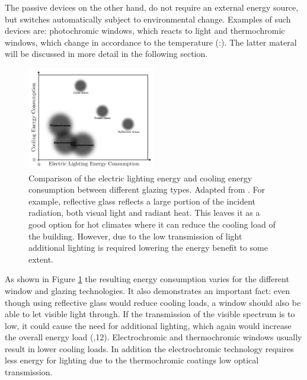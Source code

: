 %
The passive devices on the other hand, do not require an external energy source, but switches automatically
subject to environmental change. Examples of such devices are: photochromic windows, which reacts to 
light and thermochromic windows, which change in accordance to the temperature
(\cite{Kamalisarvestani2013}:\cite{Baetens2010}). The latter materal will be discussed in more detail
in the following section.
%
\begin{figure}[h!]
  \centering
   \includegraphics[width=0.5\textwidth]{Figures/chromicGlassComparison.pdf}
   \caption{Comparison of the electric lighting energy and cooling energy consumption between different
      glazing types. Adapted from \cite[p.~20]{Huovila2007}. For example, reflective glass reflects
      a large portion of the incident radiation, both visual light and radiant heat. This leaves it
      as a good option for hot climates where it can reduce the cooling load of the building. However,
      due to the low transmission of light additional lighting is required lowering the energy
      benefit to some extent.
   }
   \label{fig:energyComparison}
\end{figure}
%
As shown in Figure \ref{fig:energyComparison} the resulting energy consumption varies for the different
window and glazing technologies. 
It also demonstrates an important fact: even though using reflective glass would reduce
cooling loads, a window should also be able to let visible light through. If the transmission of
the visible spectrum is to low, it could cause the need for additional lighting, which again
would increase the overall energy load (\cite{Kamalisarvestani2013},12).
Electrochromic and thermochromic windows usually
result in lower cooling loads. In addition the electrochromic technology requires 
less energy for lighting due to the thermochromic coatings low optical transmission.
